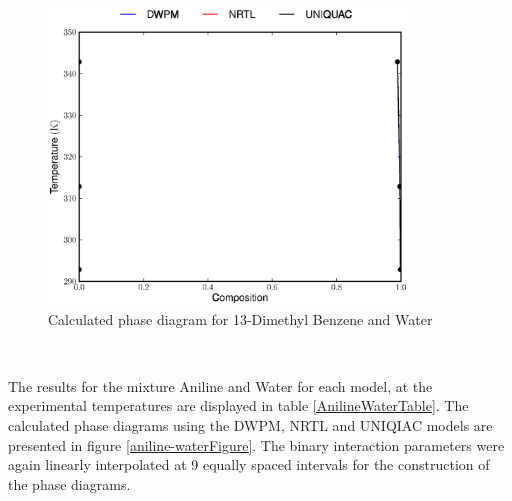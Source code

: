 \begin{figure}[hp]
\centering
\includegraphics[width = 0.85\textwidth]{Results_Parts/BinaryParams/13-dimethylbenzene-water/PhaseDiagram.eps}
\caption{Calculated phase diagram for 13-Dimethyl Benzene and Water} \label{13DimethylBenzeneWaterFigure}
\end{figure}\

\clearpage


The results for the mixture Aniline and Water for each model, at the experimental temperatures are displayed in table \ref{AnilineWaterTable}. The calculated phase diagrams using the DWPM, NRTL and UNIQIAC models are presented in figure \ref{aniline-waterFigure}. The binary interaction parameters were again linearly interpolated at 9 equally spaced intervals for the construction of the phase diagrams. 

